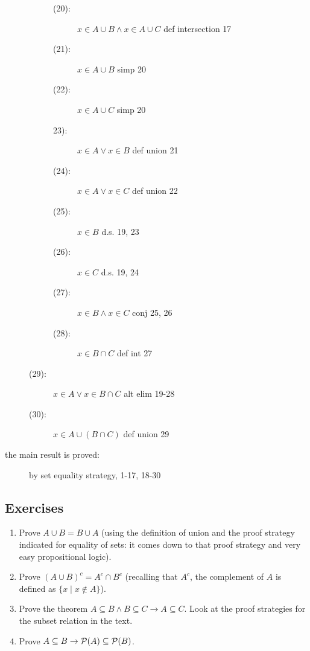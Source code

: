 \documentclass[12pt]{book}
\begin{document}
\begin{description}
\begin{description}
\begin{description}
\item[(20):]   $x \in A \cup B \wedge x \in A \cup C$  def intersection 17

\item[(21):]  $x \in A \cup B$ simp 20

\item[(22):]  $x \in A \cup C$  simp 20

\item[23):]  $x \in A \vee x \in B$  def union 21

\item[(24):]  $x \in A \vee x \in C$ def union 22

\item[(25):]  $x \in B$  d.s. 19, 23

\item[(26):]  $x \in C$  d.s. 19, 24

\item [(27):]  $x \in B \wedge x \in C$  conj 25, 26

\item[(28):]  $x \in B \cap C$  def int 27

\end{description}

\item[(29):]  $x \in A \vee x \in B \cap C$  alt elim 19-28

\item[(30):]  $x \in A \cup (B \cap C)$  def union 29

\end{description}

\item[the main result is proved:]  by set equality strategy, 1-17, 18-30

\end{description}

\newpage

\subsection{Exercises}

\begin{enumerate}

\item Prove $A \cup B = B \cup A$ (using the definition of union and the proof strategy indicated for equality of sets:  it comes down to that proof strategy and very easy propositional logic).

\item Prove $(A \cup B)^c = A^c \cap B^c$ (recalling that $A^c$, the complement of $A$ is defined as $\{x \mid x \not\in A\}$).

\item Prove the theorem $A \subseteq B \wedge B \subseteq C \rightarrow A \subseteq C$.  Look at the proof strategies for the subset relation in the text.

\item Prove $A \subseteq B \rightarrow {\cal P}(A) \subseteq {\cal P}(B)$.

\end{enumerate}
\end{document}
